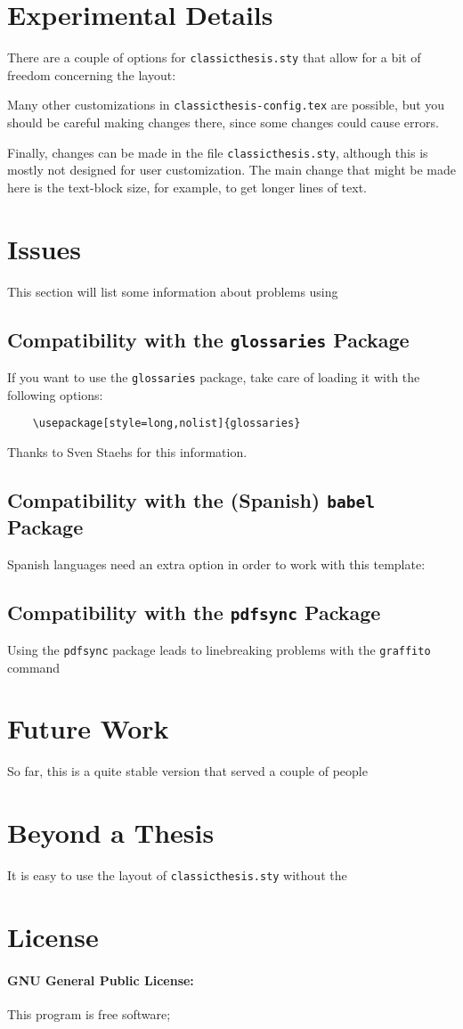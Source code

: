\section{Experimental Details}
There are a couple of options for \texttt{classicthesis.sty} that
allow for a bit of freedom concerning the layout:

Many other customizations in \texttt{classicthesis-config.tex} are
possible, but you should be careful making changes there, since some
changes could cause errors.

Finally, changes can be made in the file \texttt{classicthesis.sty},%
 although this is mostly not designed for user customization. The
main change that might be made here is the text-block size, for example,
to get longer lines of text.


\section{Issues}\label{sec:issues}
This section will list some information about problems using

\subsection*{Compatibility with the \texttt{glossaries} Package}
If you want to use the \texttt{glossaries} package, take care of loading it 
with the following options:
\begin{verbatim}
	\usepackage[style=long,nolist]{glossaries}
\end{verbatim}
Thanks to Sven Staehs for this information. 


\subsection*{Compatibility with the (Spanish) \texttt{babel} Package}
Spanish languages need an extra option in order to work with this template:


\subsection*{Compatibility with the \texttt{pdfsync} Package}
Using the \texttt{pdfsync} package leads to linebreaking problems with the \texttt{graffito} command 

\section{Future Work}
So far, this is a quite stable version that served a couple of people


\section{Beyond a Thesis}
It is easy to use the layout of \texttt{classicthesis.sty} without the


\section{License}
\paragraph{GNU General Public License:} This program is free software;
